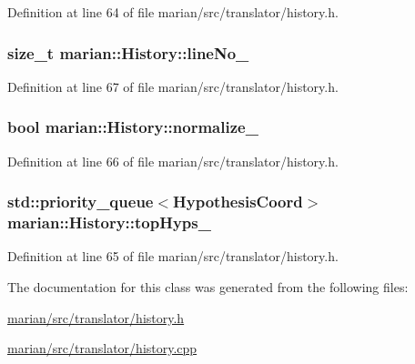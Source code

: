 Definition at line 64 of file marian/src/translator/history.\+h.

\subsubsection[{\texorpdfstring{line\+No\+\_\+}{lineNo_}}]{\setlength{\rightskip}{0pt plus 5cm}size\+\_\+t marian\+::\+History\+::line\+No\+\_\+\hspace{0.3cm}{\ttfamily [private]}}\hypertarget{classmarian_1_1History_a4ca1166441cc8f3d598355019220eff6}{}\label{classmarian_1_1History_a4ca1166441cc8f3d598355019220eff6}


Definition at line 67 of file marian/src/translator/history.\+h.

\subsubsection[{\texorpdfstring{normalize\+\_\+}{normalize_}}]{\setlength{\rightskip}{0pt plus 5cm}bool marian\+::\+History\+::normalize\+\_\+\hspace{0.3cm}{\ttfamily [private]}}\hypertarget{classmarian_1_1History_a1cf4e26623038e022a05a4be96fcd2fc}{}\label{classmarian_1_1History_a1cf4e26623038e022a05a4be96fcd2fc}


Definition at line 66 of file marian/src/translator/history.\+h.

\subsubsection[{\texorpdfstring{top\+Hyps\+\_\+}{topHyps_}}]{\setlength{\rightskip}{0pt plus 5cm}std\+::priority\+\_\+queue$<${\bf Hypothesis\+Coord}$>$ marian\+::\+History\+::top\+Hyps\+\_\+\hspace{0.3cm}{\ttfamily [private]}}\hypertarget{classmarian_1_1History_a75e9bfc4321c98b1fe52fb598f6850ce}{}\label{classmarian_1_1History_a75e9bfc4321c98b1fe52fb598f6850ce}


Definition at line 65 of file marian/src/translator/history.\+h.



The documentation for this class was generated from the following files\+:\begin{DoxyCompactItemize}
\item 
\hyperlink{marian_2src_2translator_2history_8h}{marian/src/translator/history.\+h}\item 
\hyperlink{marian_2src_2translator_2history_8cpp}{marian/src/translator/history.\+cpp}\end{DoxyCompactItemize}
